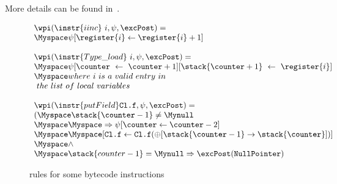  More details can be found in~\cite{WPBC}.
\begin{figure}[ht]

$$
\begin{array}{l}
\wpi(\instr{iinc} \  i , \psi, \excPost) =  \\
 \Myspace \psi[\register{i} \leftarrow \register{i} + 1 ] \\
\\
\wpi(\instr{Type\_load} \ i, \psi, \excPost) =  \\
\Myspace \psi[\counter \ \leftarrow \ \counter+1] [\stack{\counter+1} \ \leftarrow \ \register{i}] \\
 \Myspace where \ i \  is \ a \ valid \ entry \ in \\
 \ the \ list \  of \  local \ variables   \\
\\ 
\wpi(\instr{putField}\texttt{Cl.f}, \psi, \excPost) = \\
   ( \Myspace \stack{\counter -1} \not= \Mynull \\
   \Myspace  \Myspace \Rightarrow \psi[\counter \leftarrow \counter-2 ] \\
   \Myspace  \Myspace [\texttt{Cl.f} \leftarrow \texttt{Cl.f}(\oplus [\stack{\counter - 1} \rightarrow \stack{\counter}] ) ]\\
   \Myspace  \wedge  \\
   \Myspace  \stack{counter-1} = \Mynull \Rightarrow \excPost(\tt{NullPointer}) \\ 
 \end{array} $$



\caption{rules for some bytecode instructions}
\label{instrWP}
\end{figure}

